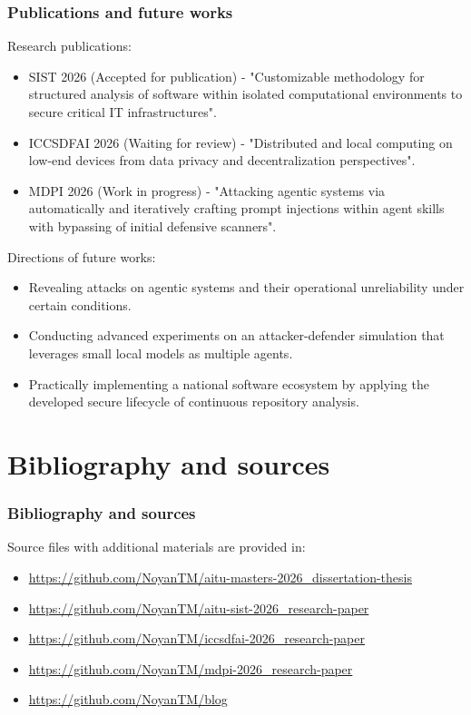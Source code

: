 \documentclass[9pt]{beamer}
\begin{document}
\begin{frame}
\frametitle{Publications and future works}
Research publications:
\begin{itemize}
    \justifying
    \item SIST 2026 (Accepted for publication) - "Customizable methodology for structured analysis of software within isolated computational environments to secure critical IT infrastructures".
    \item ICCSDFAI 2026 (Waiting for review) - "Distributed and local computing on low-end devices from data privacy and decentralization perspectives".
    \item MDPI 2026 (Work in progress) - "Attacking agentic systems via automatically and iteratively crafting prompt injections within agent skills with bypassing of initial defensive scanners".
\end{itemize}
Directions of future works: 
\begin{itemize}
    \justifying
    \item Revealing attacks on agentic systems and their operational unreliability under certain conditions.
    \item Conducting advanced experiments on an attacker-defender simulation that leverages small local models as multiple agents.
    \item Practically implementing a national software ecosystem by applying the developed secure lifecycle of continuous repository analysis.
\end{itemize}
\end{frame}

\section{Bibliography and sources}
{
\begin{frame}[allowframebreaks]
\frametitle{Bibliography and sources}
\begin{small}
Source files with additional materials are provided in:
\begin{itemize}
    \item \url{https://github.com/NoyanTM/aitu-masters-2026_dissertation-thesis}
    \item \url{https://github.com/NoyanTM/aitu-sist-2026_research-paper}
    \item \url{https://github.com/NoyanTM/iccsdfai-2026_research-paper}
    \item \url{https://github.com/NoyanTM/mdpi-2026_research-paper}
    \item \url{https://github.com/NoyanTM/blog}
\end{itemize}
\end{small}
\printbibliography
\end{frame}
}
\end{document}
